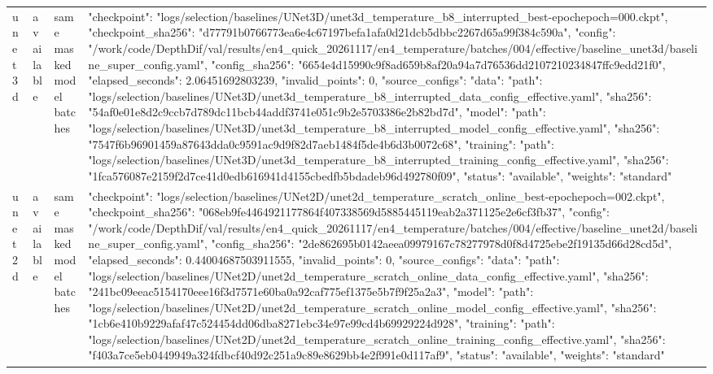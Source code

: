 \begin{tabular}{llll}
unet3d & available & same masked model batches & {"checkpoint": "logs/selection/baselines/UNet3D/unet3d_temperature_b8_interrupted_best-epochepoch=000.ckpt", "checkpoint_sha256": "d77791b0766773ea6e4c67197befa1afa0d21dcb5dbbc2267d65a99f384c590a", "config": "/work/code/DepthDif/val/results/en4_quick_20261117/en4_temperature/batches/004/effective/baseline_unet3d/baseline_super_config.yaml", "config_sha256": "6654e4d15990c9f8ad659b8af20a94a7d76536dd2107210234847ffc9edd21f0", "elapsed_seconds": 2.06451692803239, "invalid_points": 0, "source_configs": {"data": {"path": "logs/selection/baselines/UNet3D/unet3d_temperature_b8_interrupted_data_config_effective.yaml", "sha256": "54af0e01e8d2c9ccb7d789dc11bcb44addf3741e051c9b2e5703386e2b82bd7d"}, "model": {"path": "logs/selection/baselines/UNet3D/unet3d_temperature_b8_interrupted_model_config_effective.yaml", "sha256": "7547f6b96901459a87643dda0c9591ac9d9f82d7aeb1484f5de4b6d3b0072c68"}, "training": {"path": "logs/selection/baselines/UNet3D/unet3d_temperature_b8_interrupted_training_config_effective.yaml", "sha256": "1fca576087e2159f2d7ce41d0edb616941d4155cbedfb5bdadeb96d492780f09"}}, "status": "available", "weights": "standard"} \\
unet2d & available & same masked model batches & {"checkpoint": "logs/selection/baselines/UNet2D/unet2d_temperature_scratch_online_best-epochepoch=002.ckpt", "checkpoint_sha256": "068eb9fe4464921177864f407338569d5885445119eab2a371125e2e6cf3fb37", "config": "/work/code/DepthDif/val/results/en4_quick_20261117/en4_temperature/batches/004/effective/baseline_unet2d/baseline_super_config.yaml", "config_sha256": "2de862695b0142aeea09979167c78277978d0f8d4725ebe2f19135d66d28cd5d", "elapsed_seconds": 0.44004687503911555, "invalid_points": 0, "source_configs": {"data": {"path": "logs/selection/baselines/UNet2D/unet2d_temperature_scratch_online_data_config_effective.yaml", "sha256": "241bc09eeac5154170eee16f3d7571e60ba0a92caf775ef1375e5b7f9f25a2a3"}, "model": {"path": "logs/selection/baselines/UNet2D/unet2d_temperature_scratch_online_model_config_effective.yaml", "sha256": "1cb6e410b9229afaf47c524454dd06dba8271ebc34e97e99cd4b69929224d928"}, "training": {"path": "logs/selection/baselines/UNet2D/unet2d_temperature_scratch_online_training_config_effective.yaml", "sha256": "f403a7ce5eb0449949a324fdbcf40d92c251a9c89e8629bb4e2f991e0d117af9"}}, "status": "available", "weights": "standard"} \\
\bottomrule
\end{tabular}
